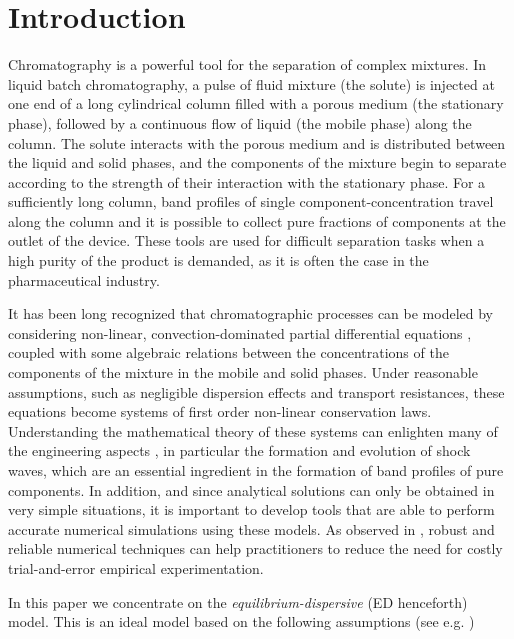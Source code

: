 \documentclass[preprint]{elsarticle}
\theoremstyle{definition}
\begin{document}
 


\section{Introduction} 
Chromatography is a powerful tool for the separation of 
 complex mixtures. In liquid batch
chromatography, a pulse of fluid mixture (the solute) is injected at 
one end of a long cylindrical column filled with a porous medium (the stationary
phase), followed by a continuous flow of liquid  (the mobile phase) 
along the column. The solute interacts with the porous medium and is
distributed between the liquid and solid phases, and the components of the mixture begin to separate according to the strength of their
interaction with the stationary phase.  For a sufficiently long column,
 band profiles of single component-concentration travel  along the
column and it is possible to collect pure fractions of components at
the outlet of the device. These tools are used for difficult separation
tasks when a high purity of the product is demanded, as it is often
the case in the pharmaceutical industry.

 It has been long recognized that
chromatographic processes can be modeled by considering non-linear,
convection-dominated partial differential equations \cite{Mazzotti2013,Guiochon}, coupled with
some algebraic relations between the concentrations of the components
of the mixture in the mobile and solid phases. Under reasonable
assumptions, such as negligible dispersion effects and transport
resistances, these equations become systems of first order non-linear
conservation laws. Understanding
the mathematical theory of these systems can enlighten many of the engineering
aspects  \cite{Mazzotti2013}, in particular the formation and evolution of shock
waves, which are an essential ingredient in the formation of band profiles of pure components. In addition, and since analytical solutions can  only be obtained in very
simple situations, it is important to develop  tools that are
able to perform accurate 
numerical simulations using these models. As observed in \cite{Seidel},
robust and reliable numerical techniques  can help  practitioners to
reduce the need for costly trial-and-error empirical experimentation.



In this paper we concentrate on the {\em equilibrium-dispersive} (ED
henceforth) model. This is an ideal
model  based on the following assumptions (see e.g. \cite{Javeed,Guiochon})
\end{document}
